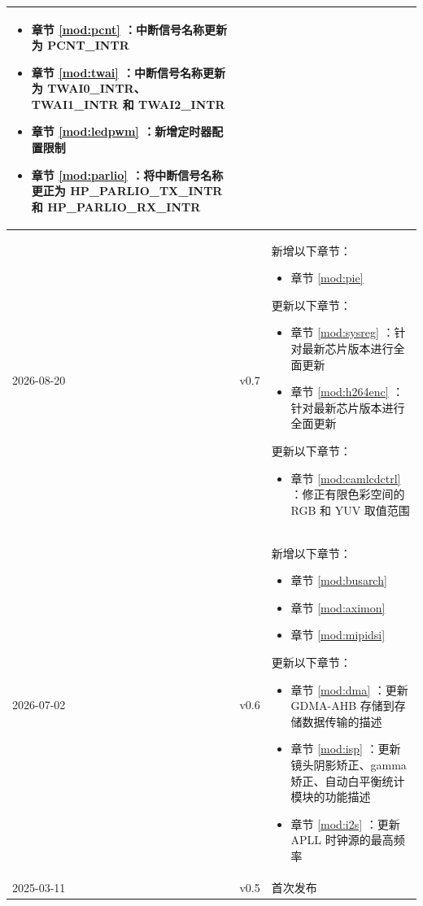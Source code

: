 \begin{longtable}[l]{ | m{2cm} | m{1.5cm} | m{12cm} | }
\begin{itemize}
        \item 章节 \ref{mod:pcnt} \textit{\nameref{mod:pcnt}}：中断信号名称更新为 PCNT\_INTR
        \item 章节 \ref{mod:twai} \textit{\nameref{mod:twai}}：中断信号名称更新为 TWAI0\_INTR、TWAI1\_INTR 和 TWAI2\_INTR %
        \item 章节 \ref{mod:ledpwm} \textit{\nameref{mod:ledpwm}}：新增定时器配置限制 %
        \item 章节 \ref{mod:parlio} \textit{\nameref{mod:parlio}}：将中断信号名称更正为 HP\_PARLIO\_TX\_INTR 和 HP\_PARLIO\_RX\_INTR %
    \end{itemize}
    \\\hline
    2026-08-20 & v0.7 & 新增以下章节：
    \begin{itemize}
        \item 章节 \ref{mod:pie} \textit{\nameref{mod:pie}}
    \end{itemize}
    更新以下章节：
    \begin{itemize}
        \item 章节 \ref{mod:sysreg} \textit{\nameref{mod:sysreg}}：针对最新芯片版本进行全面更新
        \item 章节 \ref{mod:h264enc} \textit{\nameref{mod:h264enc}}：针对最新芯片版本进行全面更新
    \end{itemize}

    更新以下章节：
    \begin{itemize}
        \item 章节 \ref{mod:camlcdctrl} \textit{\nameref{mod:camlcdctrl}}：修正有限色彩空间的 RGB 和 YUV 取值范围
    \end{itemize}
    \\\hline
    2026-07-02 & v0.6 & 新增以下章节：
    \begin{itemize}
        \item 章节 \ref{mod:busarch} \textit{\nameref{mod:busarch}}
        \item 章节 \ref{mod:aximon} \textit{\nameref{mod:aximon}}
        \item 章节 \ref{mod:mipidsi} \textit{\nameref{mod:mipidsi}}
    \end{itemize}

    更新以下章节：
    \begin{itemize}
        \item 章节 \ref{mod:dma} \textit{\nameref{mod:dma}}：更新 GDMA-AHB 存储到存储数据传输的描述 %
        \item 章节 \ref{mod:isp} \textit{\nameref{mod:isp}}：更新镜头阴影矫正、gamma 矫正、自动白平衡统计模块的功能描述 %
        \item 章节 \ref{mod:i2s} \textit{\nameref{mod:i2s}}：更新 APLL 时钟源的最高频率 %
    \end{itemize}
    \\\hline
    2025-03-11 & v0.5 & 首次发布\\\hline

\end{longtable}

